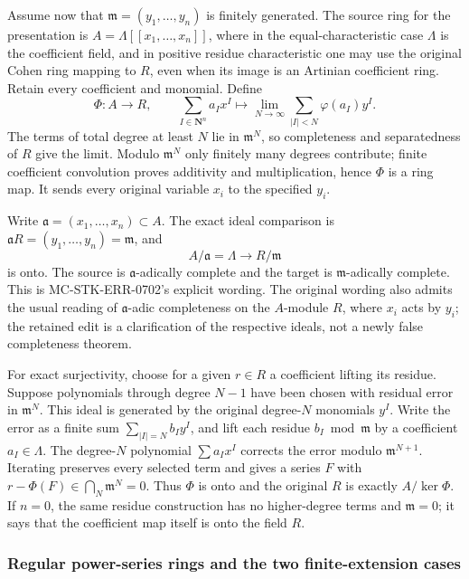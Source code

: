 Assume now that \(\mathfrak m=(y_1,\ldots,y_n)\) is finitely generated. The source ring for the presentation is \(A=\Lambda[[x_1,\ldots,x_n]]\), where in the equal-characteristic case \(\Lambda\) is the coefficient field, and in positive residue characteristic one may use the original Cohen ring mapping to \(R\), even when its image is an Artinian coefficient ring. Retain every coefficient and monomial. Define \[
 \Phi:A\longrightarrow R,\qquad
 \sum_{I\in\mathbf N^n}a_Ix^I
 \longmapsto
 \lim_{N\to\infty}\sum_{|I|<N}\varphi(a_I)y^I.
\] The terms of total degree at least \(N\) lie in \(\mathfrak m^N\), so completeness and separatedness of \(R\) give the limit. Modulo \(\mathfrak m^N\) only finitely many degrees contribute; finite coefficient convolution proves additivity and multiplication, hence \(\Phi\) is a ring map. It sends every original variable \(x_i\) to the specified \(y_i\).

Write \(\mathfrak a=(x_1,\ldots,x_n)\subset A\). The exact ideal comparison is \(\mathfrak aR=(y_1,\ldots,y_n)=\mathfrak m\), and \[
 A/\mathfrak a=\Lambda\longrightarrow R/\mathfrak m
\] is onto. The source is \(\mathfrak a\)-adically complete and the target is \(\mathfrak m\)-adically complete. This is MC-STK-ERR-0702's explicit wording. The original wording also admits the usual reading of \(\mathfrak a\)-adic completeness on the \(A\)-module \(R\), where \(x_i\) acts by \(y_i\); the retained edit is a clarification of the respective ideals, not a newly false completeness theorem.

For exact surjectivity, choose for a given \(r\in R\) a coefficient lifting its residue. Suppose polynomials through degree \(N-1\) have been chosen with residual error in \(\mathfrak m^N\). This ideal is generated by the original degree-\(N\) monomials \(y^I\). Write the error as a finite sum \(\sum_{|I|=N}b_Iy^I\), and lift each residue \(b_I\bmod\mathfrak m\) by a coefficient \(a_I\in\Lambda\). The degree-\(N\) polynomial \(\sum a_Ix^I\) corrects the error modulo \(\mathfrak m^{N+1}\). Iterating preserves every selected term and gives a series \(F\) with \(r-\Phi(F)\in\bigcap_N\mathfrak m^N=0\). Thus \(\Phi\) is onto and the original \(R\) is exactly \(A/\ker\Phi\). If \(n=0\), the same residue construction has no higher-degree terms and \(\mathfrak m=0\); it says that the coefficient map itself is onto the field \(R\).

\subsubsection{Regular power-series rings and the two finite-extension cases}\label{algebra-proof-065-regular-power-series-rings-and-the-two-finite-extension-cases}

